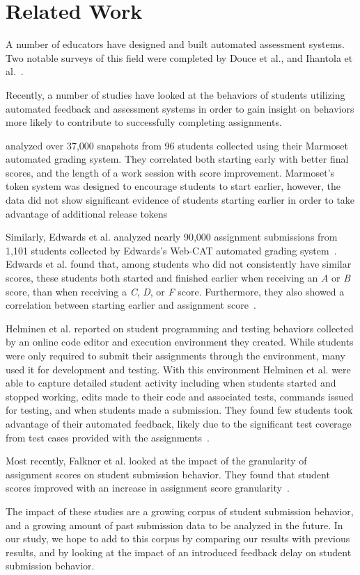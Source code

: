 \section{Related Work}

A number of educators have designed and built automated assessment systems. Two
notable surveys of this field were completed by Douce et al., and Ihantola et
al.~\cite{Douce:2005:ATA:1163405.1163409, Ihantola:2010:RRS:1930464.1930480}.

Recently, a number of studies have looked at the behaviors of students
utilizing automated feedback and assessment systems in order to gain insight on
behaviors more likely to contribute to successfully completing assignments.

\spacco{} analyzed over 37,000 snapshots from 96 students collected using their
Marmoset automated grading system. They correlated both starting early with
better final scores, and the length of a work session with score
improvement. Marmoset's token system was designed to encourage students to
start earlier, however, the data did not show significant evidence of students
starting earlier in order to take advantage of additional release
tokens~\cite{Spacco:2013:TIP:2462476.2465594, Spacco:2006:EMD:1140124.1140131}

Similarly, Edwards et al. analyzed nearly 90,000 assignment submissions from
1,101 students collected by Edwards's Web-CAT automated grading
system~\cite{Edwards:2003:RCS:949344.949390}. Edwards et al. found that, among
students who did not consistently have similar scores, these students both
started and finished earlier when receiving an \emph{A} or \emph{B} score, than
when receiving a \emph{C}, \emph{D}, or \emph{F} score. Furthermore, they also
showed a correlation between starting earlier and assignment
score~\cite{Edwards:2009:CEI:1584322.1584325}.

Helminen et al. reported on student programming and testing behaviors collected
by an online code editor and execution environment they created. While students
were only required to submit their assignments through the environment, many
used it for development and testing. With this environment Helminen et al. were
able to capture detailed student activity including when students started and
stopped working, edits made to their code and associated tests, commands issued
for testing, and when students made a submission.  They found few students took
advantage of their automated feedback, likely due to the significant test
coverage from test cases provided with the
assignments~\cite{Helminen:2013:RAI:2526968.2526970}.

Most recently, Falkner et al. looked at the impact of the granularity of
assignment scores on student submission behavior. They found that student
scores improved with an increase in assignment score
granularity~\cite{Falkner:2014:IEA:2538862.2538896}.

The impact of these studies are a growing corpus of student submission
behavior, and a growing amount of past submission data to be analyzed in the
future. In our study, we hope to add to this corpus by comparing our results
with previous results, and by looking at the impact of an introduced feedback
delay on student submission behavior.
